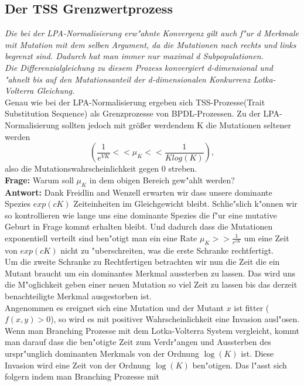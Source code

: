 \documentclass[11pt, a4paper, german]{article}
\begin{document}
	
	\subsection{Der TSS Grenzwertprozess}
	\textit{Die bei der LPA-Normalisierung erw"ahnte Konvergenz  gilt auch f"ur d Merkmale mit Mutation mit dem selben Argument, da die Mutationen nach rechts und links begrenzt sind. Dadurch hat man immer nur maximal d Subpopulationen.\\
	Die Differenzialgleichung zu diesem Prozess konvergiert d-dimensional und "ahnelt bis auf den Mutationsanteil der d-dimensionalen Konkurrenz Lotka-Volterra Gleichung.}\\
	Genau wie bei der LPA-Normalisierung ergeben sich TSS-Prozesse(Trait Substitution Sequence) als Grenzprozesse von BPDL-Prozessen. Zu der LPA-Normalisierung sollten jedoch mit größer werdendem K die Mutationen seltener werden 
	\[ \left( \frac{1}{e^{VK}} << \mu_K << \frac{1}{K log(K)} \right), \] 
	also die Mutationswahrscheinlichkeit gegen 0 streben.\\ 
	\textbf{Frage:} Warum soll $ \mu_K $ in dem obigen Bereich gew"ahlt werden?\\
	\textbf{Antwort:} Dank Freidlin and Wenzell \cite{freidlin2012random} erwarten wir dass unsere dominante Spezies $ exp(cK) $ Zeiteinheiten im Gleichgewicht bleibt. Schlie"slich k"onnen wir so kontrollieren wie lange uns eine dominante Spezies die f"ur eine mutative Geburt in Frage kommt erhalten bleibt. Und dadurch dass die Mutationen exponentiell verteilt sind ben"otigt man ein eine Rate $ \mu_K >> \frac{1}{e^{cK}} $ um eine Zeit von $ exp(cK) $ nicht zu "uberschreiten, was die erste Schranke rechtfertigt.\\
	Um die zweite Schranke zu Rechtfertigen betrachten wir nun die Zeit die ein Mutant braucht um ein dominantes Merkmal aussterben zu lassen. Das wird uns die M"oglichkeit geben einer neuen Mutation so viel Zeit zu lassen bis das derzeit benachteiligte Merkmal ausgestorben ist.\\
	Angenommen es ereignet sich eine Mutation und der Mutant $ x $ ist fitter ($ f(x,y) > 0 $), so wird es mit positiver Wahrscheinlichkeit eine Invasion ausl"osen. Wenn man Branching Prozesse mit dem Lotka-Volterra System vergleicht, kommt man darauf dass die ben"otigte Zeit zum Verdr"angen und Aussterben des urspr"unglich dominanten Merkmals von der Ordnung $ \log(K) $ ist.
	Diese Invasion wird eine Zeit von der Ordnung $ \log(K) $ ben"otigen. Das l"asst sich folgern indem man Branching Prozesse mit 
	
\end{document}
